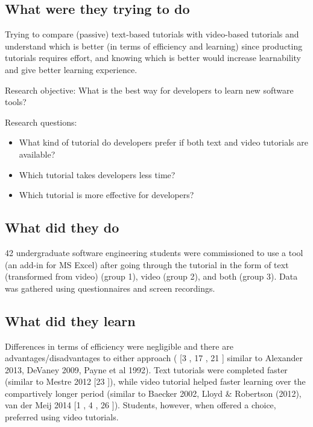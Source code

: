 \subsection{What were they trying to do}

Trying to compare (passive) text-based tutorials with video-based tutorials and understand which is better (in terms of efficiency and learning) since producting tutorials requires effort, and knowing which is better would increase learnability and give better learning experience.

Research objective: What is the best way for developers to learn new software tools?

Research questions:

\begin{itemize}
    \item What kind of tutorial do developers prefer if both text and video tutorials are available?
    \item Which tutorial takes developers less time?
    \item Which tutorial is more effective for developers?
\end{itemize}

\subsection{What did they do}

42 undergraduate software engineering students were commissioned to use a tool (an add-in for MS Excel) after going through the tutorial in the form of text (transformed from video) (group 1), video (group 2), and both (group 3). Data was gathered using questionnaires and screen recordings.

\subsection{What did they learn}

Differences in terms of efficiency were negligible and there are advantages/disadvantages to either approach ( [3 \cite{baeckerShowingInsteadTelling2002}, 17 \cite{lloydScreencastTutorialsEnhance2012}, 21 \cite{vandermeijComparisonPaperbasedVideo2014}] similar to Alexander 2013, DeVaney 2009, Payne et al 1992). Text tutorials were completed faster (similar to Mestre 2012 [23 \cite{mestreStudentPreferenceTutorial2012}]), while video tutorial helped faster learning over the compartively longer period (similar to Baecker 2002, Lloyd \& Robertson (2012), van der Meij 2014 [1 \cite{alexanderUsabilityPrintOnline2013}, 4 \cite{devaney2009impact}, 26 \cite{payneAnimatedDemonstrationsExploratory1992}]). Students, however, when offered a choice, preferred using video tutorials.
